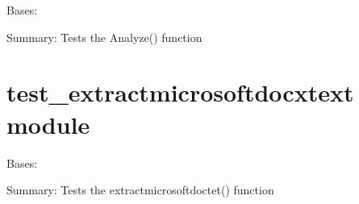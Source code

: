 \documentclass[letterpaper,10pt,english]{sphinxmanual}
\begin{document}
\begin{fulllineitems}
\label{\detokenize{unit_tests:unit_tests.test_analyze.TestAnalyze}}
Bases: 

\begin{fulllineitems}
\label{\detokenize{unit_tests:unit_tests.test_analyze.TestAnalyze.test_analyze}}
Summary: Tests the Analyze() function

\end{fulllineitems}


\end{fulllineitems}



\section{test\_extractmicrosoftdocxtext module}
\label{\detokenize{unit_tests:test-extractmicrosoftdocxtext-module}}\label{\detokenize{unit_tests:module-unit_tests.test_extractmicrosoftdocxtext}}

\begin{fulllineitems}
\label{\detokenize{unit_tests:unit_tests.test_extractmicrosoftdocxtext.TestExtractmicrosoftdocxtext}}
Bases: 

\begin{fulllineitems}
\label{\detokenize{unit_tests:unit_tests.test_extractmicrosoftdocxtext.TestExtractmicrosoftdocxtext.test_extractmicrosoftdocxtext}}
Summary: Tests the extractmicrosoftdoctet() function

\end{fulllineitems}


\end{fulllineitems}
\end{document}
